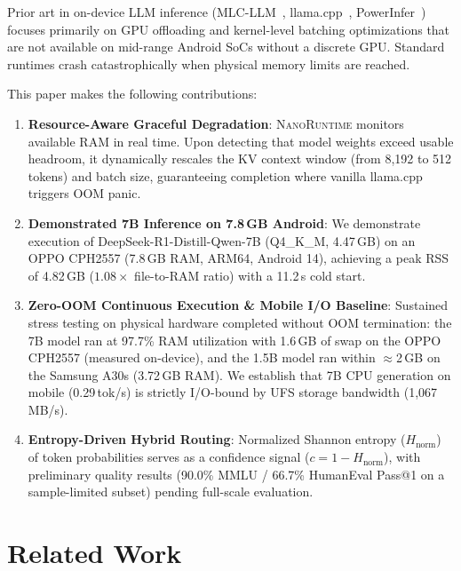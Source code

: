 \documentclass[11pt]{article}
\newcommand{\nanort}{\textsc{NanoRuntime}}
\begin{document}
Prior art in on-device LLM inference (MLC-LLM~\cite{mlcllm2023},
llama.cpp~\cite{llamacpp2023}, PowerInfer~\cite{powerinfer2023})
focuses primarily on GPU offloading and kernel-level batching optimizations
that are not available on mid-range Android SoCs without a discrete GPU.
Standard runtimes crash catastrophically when physical memory limits are reached.

This paper makes the following contributions:
\begin{enumerate}
  \item \textbf{Resource-Aware Graceful Degradation}:
    \nanort{} monitors available RAM in real time. Upon detecting that model weights
    exceed usable headroom, it dynamically rescales the KV context window
    (from 8,192 to 512 tokens) and batch size, guaranteeing completion where
    vanilla llama.cpp triggers OOM panic.

  \item \textbf{Demonstrated 7B Inference on 7.8\,GB Android}:
    We demonstrate execution of DeepSeek-R1-Distill-Qwen-7B (Q4\_K\_M, 4.47\,GB)
    on an OPPO CPH2557 (7.8\,GB RAM, ARM64, Android 14), achieving a peak RSS of
    4.82\,GB ($1.08\times$ file-to-RAM ratio) with a 11.2\,s cold start.

  \item \textbf{Zero-OOM Continuous Execution \& Mobile I/O Baseline}:
    Sustained stress testing on physical hardware completed without OOM
    termination: the 7B model ran at 97.7\% RAM utilization with 1.6\,GB of
    swap on the OPPO CPH2557 (measured on-device), and the 1.5B model ran
    within $\approx$2\,GB on the Samsung A30s (3.72\,GB RAM). We establish
    that 7B CPU generation on mobile (0.29\,tok/s) is strictly I/O-bound by
    UFS storage bandwidth (1,067\,MB/s).

  \item \textbf{Entropy-Driven Hybrid Routing}:
    Normalized Shannon entropy ($H_{\text{norm}}$) of token probabilities serves as a
    confidence signal ($c = 1 - H_{\text{norm}}$), with preliminary quality results
    (90.0\% MMLU / 66.7\% HumanEval Pass@1 on a sample-limited subset) pending
    full-scale evaluation.
\end{enumerate}

\section{Related Work}
\label{sec:related}
\end{document}
